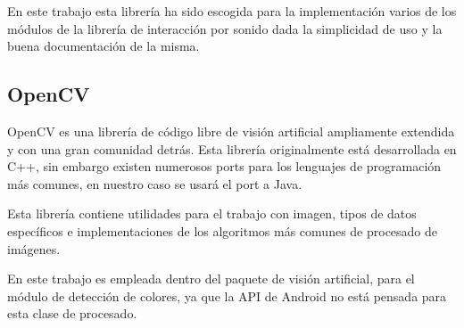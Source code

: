  En este trabajo esta librería ha sido escogida para la implementación varios de los módulos de la librería de interacción por sonido dada la simplicidad de uso  y la buena documentación de la misma.
 
 \subsection{OpenCV}
  \label{subsec:opencv}
 OpenCV\cite{itseez2015opencv} es una librería de código libre de visión artificial ampliamente extendida y con una gran comunidad detrás.
 Esta librería originalmente está desarrollada en C++, sin embargo existen numerosos ports para los lenguajes de programación más comunes, en nuestro caso se usará el port a Java.
 
 Esta librería contiene utilidades para el trabajo con imagen, tipos de datos específicos e implementaciones de los algoritmos más comunes de procesado de imágenes.
 
 En este trabajo es empleada dentro del paquete de visión artificial, para el módulo de detección de colores, ya que la API de Android no está pensada para esta clase de procesado.


